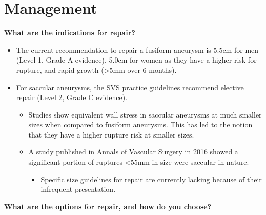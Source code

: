 \documentclass[
]{book}
\providecommand{\tightlist}{%
  \setlength{\itemsep}{0pt}\setlength{\parskip}{0pt}}
\begin{document}
\hypertarget{management-1}{%
\section{Management}\label{management-1}}

\textbf{What are the indications for repair?}
\citep{mooreVascularEndovascularSurgery2019}

\begin{itemize}
\item
  The current recommendation to repair a fusiform aneurysm is 5.5cm
  for men (Level 1, Grade A evidence), 5.0cm for women as they have a
  higher risk for rupture, and rapid growth (\textgreater5mm over 6 months).
  \citep{chaikofSocietyVascularSurgery2018a}
\item
  For saccular aneurysms, the SVS practice guidelines recommend
  elective repair (Level 2, Grade C evidence).
  \citep{chaikofSocietyVascularSurgery2018a}

  \begin{itemize}
  \item
    Studies show equivalent wall stress in saccular aneurysms at
    much smaller sizes when compared to fusiform aneurysms. This has
    led to the notion that they have a higher rupture risk at
    smaller sizes.
  \item
    A study published in Annals of Vascular Surgery in 2016 showed a
    significant portion of ruptures \textless55mm in size were saccular in
    nature. \citep{kristmundssonMorphologySmallAbdominal2016}

    \begin{itemize}
    \tightlist
    \item
      Specific size guidelines for repair are currently lacking
      because of their infrequent presentation.
    \end{itemize}
  \end{itemize}
\end{itemize}

\textbf{What are the options for repair, and how do you choose?}
\citep{mooreVascularEndovascularSurgery2019, fairman72AortoiliacAneurysms2019}
\end{document}
